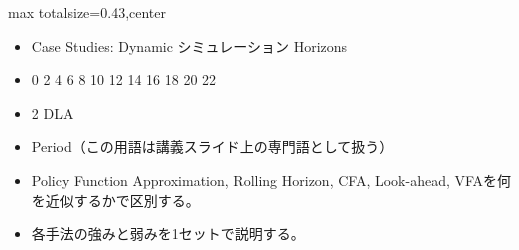 \clearpage
{}
\begin{minipage}[t]{0.405\textwidth}
\begin{adjustbox}{max totalsize={\textwidth}{0.43\textheight},center}
\begin{minipage}{\textwidth}\scriptsize
{}\begin{itemize}
\item Case Studies: Dynamic シミュレーション Horizons
\item 0 2 4 6 8 10 12 14 16 18 20 22
\item 2 DLA
\item Period（この用語は講義スライド上の専門語として扱う）
\end{itemize}\begin{itemize}
\item Policy Function Approximation, Rolling Horizon, CFA, Look-ahead, VFAを何を近似するかで区別する。
\item 各手法の強みと弱みを1セットで説明する。
\end{itemize}
\end{minipage}
\end{adjustbox}
\end{minipage}\hfill
